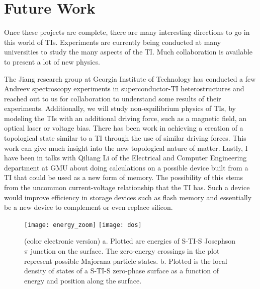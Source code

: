 \documentclass[12pt,twocolumn]{article}
\begin{document}
\clearpage
\section*{Future Work}
Once these projects are complete, there are many interesting directions to go in this world of TIs. Experiments are currently being conducted at many universities to study the many aspects of the TI. Much collaboration is available to present a lot of new physics.

The Jiang research group at Georgia Institute of Technology has conducted a few Andreev spectroscopy experiments in superconductor-TI heterostructures and reached out to us for collaboration to understand some results of their experiments. Additionally, we will study non-equilibrium physics of TIs, by modeling the TIs with an additional driving force, such as a magnetic field, an optical laser or voltage bias. There has been work in achieving a creation of a topological state similar to a TI through the use of similar driving forces. This work can give much insight into the new topological nature of matter. Lastly, I have been in talks with Qiliang Li of the Electrical and Computer Engineering department at GMU about doing calculations on a possible device built from a TI that could be used as a new form of memory. The possibility of this stems from the uncommon current-voltage relationship that the TI has. Such a device would improve efficiency in storage devices such as flash memory and essentially be a new device to complement or even replace silicon.
\begin{figure}[ht]

\texttt{[image: energy\_zoom]}
\texttt{[image: dos]}

\caption{(color electronic version) a. Plotted are energies of S-TI-S Josephson $\pi$ junction on the surface. The zero-energy crossings in the plot represent possible Majorana particle states. b. Plotted is the local density of states of a S-TI-S zero-phase surface as a function of energy and position along the surface. 
}\label{setup}
\end{figure}
\end{document}
